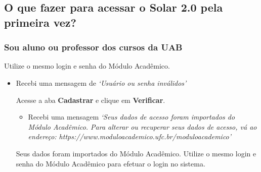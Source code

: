 \documentclass[letterpaper,10pt,english]{sphinxmanual}
\begin{document}
\subsection{O que fazer para acessar o Solar 2.0 pela primeira vez?}
\label{faq:o-que-fazer-para-acessar-o-solar-2-0-pela-primeira-vez}

\subsubsection{Sou aluno ou professor dos cursos da UAB}
\label{faq:id1}
Utilize o mesmo login e senha do Módulo Acadêmico.
\begin{itemize}
\item {} 
Recebi uma mensagem de \emph{`Usuário ou senha inválidos'}

Acesse a aba \textbf{Cadastrar} e clique em \textbf{Verificar}.
\begin{itemize}
\item {} 
Recebi uma mensagem \emph{`Seus dados de acesso foram importados do Módulo Acadêmico. Para alterar ou recuperar seus dados de acesso, vá ao endereço: https://www.moduloacademico.ufc.br/moduloacademico'}

\end{itemize}

Seus dados foram importados do Módulo Acadêmico. Utilize o mesmo login e senha do Módulo Acadêmico para efetuar o login no sistema.

\end{itemize}
\end{document}
